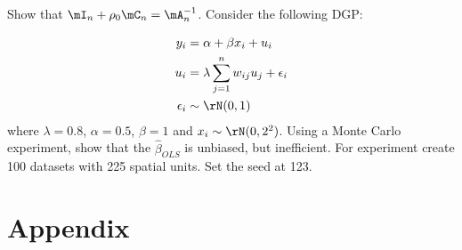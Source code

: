 \documentclass[english,12pt]{book}\usepackage[]{graphicx}\usepackage[]{xcolor}
\begin{document}
\begin{exercises}
   \exercise  Show that $\mI_n + \rho_0\mC_n = \mA_n^{-1}$.
   \exercise  Consider the following DGP:

\begin{equation}
	\begin{aligned}
		y_i & = \alpha + \beta x_i + u_i \\
		u_i & = \lambda \sum_{j =  1}^n w_{ij}u_{j} + \epsilon_i \\
		\epsilon_i &\sim \rN(0, 1) 
	\end{aligned}
\end{equation}
%
where $\lambda = 0.8$, $\alpha = 0.5$, $\beta = 1$ and $x_i \sim \rN(0, 2^2)$. Using a Monte Carlo experiment, show that the $\widehat{\beta}_{OLS}$ is unbiased, but inefficient. For experiment create 100 datasets with 225 spatial units. Set the seed at 123.


\end{exercises}   
    
    

\section*{Appendix}
\end{document}
